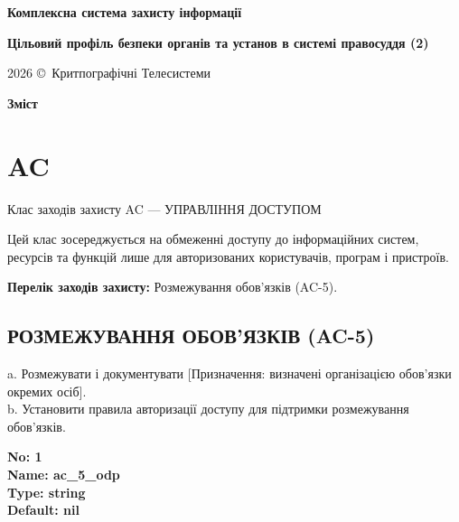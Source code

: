 \documentclass{article}
\newcommand\HUGE[1]{\fontsize{40}{40}\selectfont #1}
\begin{document}
\pagestyle{fancy}

\begin{titlepage}
  \AddToShipoutPictureBG*{\AtPageLowerLeft{\color{nato}\rule{\paperwidth}{\paperheight}}}
  \color{white}\thispagestyle{empty}\vspace*{4cm}\centering
  {\Huge  \textbf{Комплексна система захисту інформації} \par} \vspace{2cm}
  {\HUGE  \textbf{Цільовий профіль безпеки органів та установ в системі правосуддя (2)} \par} \vspace{2.5cm}
  \vfill
  {\large 2026 \copyright\ Критпографічні Телесистеми \par}
\end{titlepage}

\newpage

\begin{center}
  {\Huge\color{nato}\bfseries Зміст\par}
\end{center}
\vspace{40pt}
\tableofcontents

\begin{abstract}
Цільовий профіль безпеки (ЦПБ) — індивідуальний для конкретної системи підприємства. Саме на його основі створюється/модернізується КЗЗІ. Включає лише додаткові вимоги (відмінності) відносно Галузевого профілю.
\end{abstract}

\section{AC}
Клас заходів захисту AC --- УПРАВЛІННЯ ДОСТУПОМ

Цей клас зосереджується на обмеженні доступу до інформаційних систем, ресурсів та функцій лише для авторизованих користувачів, програм і пристроїв.

\textbf{Перелік заходів захисту:} Розмежування обов'язків (AC-5).

\subsection{РОЗМЕЖУВАННЯ ОБОВ'ЯЗКІВ (AC-5)}
a. Розмежувати і документувати [Призначення: визначені організацією обов'язки окремих осіб].\\ 
b. Установити правила авторизації доступу для підтримки розмежування обов'язків.

\vspace{10pt}
{\footnotesize\bfseries
No: 1\\
Name: ac\_\allowbreak{}5\_\allowbreak{}odp\\
Type: string\\
Default: nil
}
\end{document}
